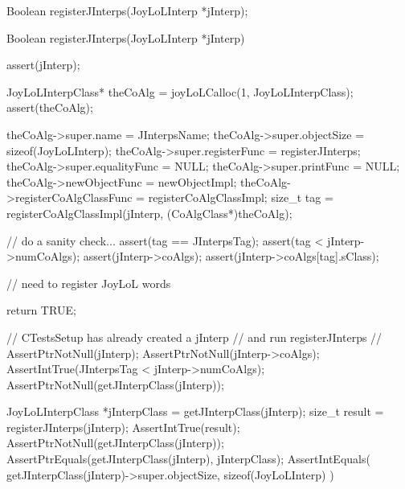 \startTestSuite[regiserJInterps]

\startCHeader
Boolean registerJInterps(JoyLoLInterp *jInterp);
\stopCHeader
{}

\startCCode
Boolean registerJInterps(JoyLoLInterp *jInterp) {
  assert(jInterp);
  
  JoyLoLInterpClass* theCoAlg =
    joyLoLCalloc(1, JoyLoLInterpClass);
  assert(theCoAlg);
  
  theCoAlg->super.name             = JInterpsName;
  theCoAlg->super.objectSize       = sizeof(JoyLoLInterp);
  theCoAlg->super.registerFunc     = registerJInterps;
  theCoAlg->super.equalityFunc     = NULL;
  theCoAlg->super.printFunc        = NULL;
  theCoAlg->newObjectFunc          = newObjectImpl;
  theCoAlg->registerCoAlgClassFunc = registerCoAlgClassImpl;
  size_t tag =
    registerCoAlgClassImpl(jInterp, (CoAlgClass*)theCoAlg);
  
  // do a sanity check...
  assert(tag == JInterpsTag);
  assert(tag < jInterp->numCoAlgs);
  assert(jInterp->coAlgs);
  assert(jInterp->coAlgs[tag].sClass);
    
  // need to register JoyLoL words
  
  return TRUE;
}
\stopCCode


\startCTest
  // CTestsSetup has already created a jInterp 
  // and run registerJInterps
  //
  AssertPtrNotNull(jInterp);
  AssertPtrNotNull(jInterp->coAlgs);
  AssertIntTrue(JInterpsTag < jInterp->numCoAlgs);
  AssertPtrNotNull(getJInterpClass(jInterp));
  
  JoyLoLInterpClass *jInterpClass = getJInterpClass(jInterp);
  size_t result = registerJInterps(jInterp);
  AssertIntTrue(result);
  AssertPtrNotNull(getJInterpClass(jInterp));
  AssertPtrEquals(getJInterpClass(jInterp), jInterpClass);
  AssertIntEquals(
    getJInterpClass(jInterp)->super.objectSize,
    sizeof(JoyLoLInterp)
  )
\stopCTest
\stopTestCase
\stopTestSuite
